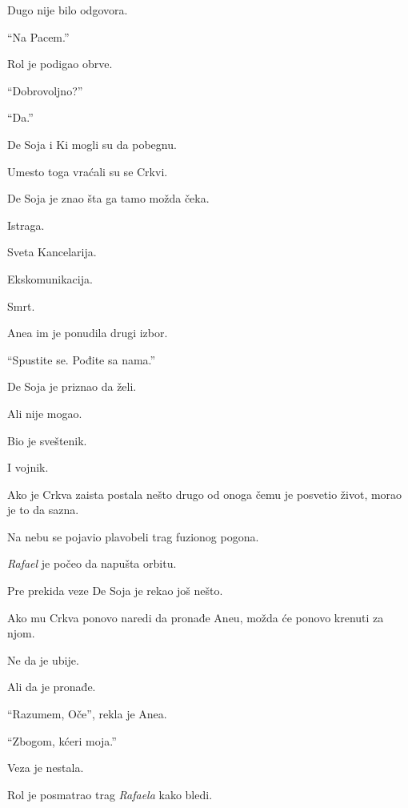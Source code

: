 Dugo nije bilo odgovora.

``Na Pacem.''

\bigskip

Rol je podigao obrve.

``Dobrovoljno?''

``Da.''

\bigskip

De Soja i Ki mogli su da pobegnu.

Umesto toga vraćali su se Crkvi.

\bigskip

De Soja je znao šta ga tamo možda čeka.

Istraga.

Sveta Kancelarija.

Ekskomunikacija.

Smrt.

\bigskip

Anea im je ponudila drugi izbor.

``Spustite se. Pođite sa nama.''

\bigskip

De Soja je priznao da želi.

Ali nije mogao.

\bigskip

Bio je sveštenik.

I vojnik.

Ako je Crkva zaista postala nešto drugo od onoga čemu je posvetio život, morao je to da sazna.

\bigskip

Na nebu se pojavio plavobeli trag fuzionog pogona.

\emph{Rafael} je počeo da napušta orbitu.

\bigskip

Pre prekida veze De Soja je rekao još nešto.

Ako mu Crkva ponovo naredi da pronađe Aneu, možda će ponovo krenuti za njom.

\bigskip

Ne da je ubije.

Ali da je pronađe.

\bigskip

``Razumem, Oče'', rekla je Anea.

\bigskip

``Zbogom, kćeri moja.''

\bigskip

Veza je nestala.

\bigskip

Rol je posmatrao trag \emph{Rafaela} kako bledi.

